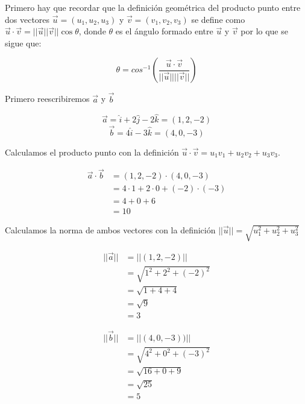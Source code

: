 \documentclass[12pt]{article}
\begin{document}
Primero hay que recordar que la definición geométrica del producto punto entre dos vectores $\vec{u} = (u_1, u_2, u_3)$ y  $\vec{v} = (v_1, v_2, v_3)$ se define como  $\vec{u} \cdot \vec{v} = ||\vec{u} || \vec{v}|| \cos{\theta}$, donde $\theta$ es el ángulo formado entre $\vec{u}$ y $\vec{v}$  por lo que se sigue que:

\[
\theta = cos^{-1 }\left(\frac{\vec{u} \cdot \vec{v}}{||\vec{u}|| ||\vec{v}||}\right)
\]

Primero reescribiremos $\vec{a}$ y $\vec{b}$

\[
\vec{a} =  \hat{i} + 2\hat{j}-2\hat{k} = (1, 2, -2)
\]
\[
\vec{b} =4\hat{i} -3\hat{k}= (4, 0, -3)
\]

Calculamos el producto punto con la definición  $\vec{u} \cdot \vec{v} = u_1v_1 + u_2v_2+u_3v_3$.

\begin{equation*}
  \begin{split}
    \vec{a} \cdot \vec{b}  &= (1, 2, -2) \cdot  (4, 0, -3)  \\
    &= 4 \cdot 1 + 2 \cdot 0 + (-2) \cdot (-3) \\
    &= 4 + 0 +6 \\
    &= 10 
  \end{split}
\end{equation*}

Calculamos la norma de ambos vectores con la definición $ ||\vec{u}|| = \sqrt{u_1^2 + u_2^2 + u_3^2} $

\begin{equation*}
  \begin{split}
    ||\vec{a}||  &= ||(1, 2, -2)||  \\
    &= \sqrt{1^2 + 2^2 + (-2)^2} \\
    &= \sqrt{1 + 4 + 4} \\
    &= \sqrt{9} \\
    &=3
  \end{split}
\end{equation*}

\begin{equation*}
  \begin{split}
    ||\vec{b}||  &= ||(4, 0, -3))||  \\
    &= \sqrt{4^2 + 0^2 + (-3)^2} \\
    &= \sqrt{16 + 0 + 9} \\
    &= \sqrt{25} \\
    &= 5
  \end{split}
\end{equation*}
\end{document}
